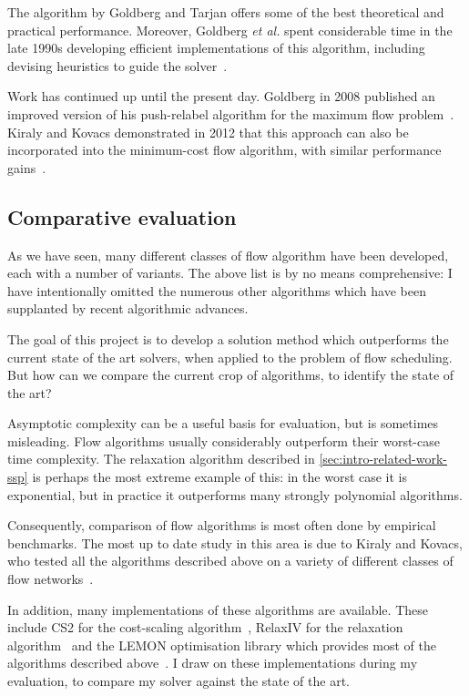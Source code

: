 The algorithm by Goldberg and Tarjan offers some of the best theoretical and practical performance. Moreover, Goldberg \textit{et al.} spent considerable time in the late 1990s developing efficient implementations of this algorithm, including devising heuristics to guide the solver~\cite{Goldberg:1997,Bunnagel:1998}.

Work has continued up until the present day. Goldberg in 2008 published an improved version of his push-relabel algorithm for the maximum flow problem~\cite{Goldberg:2008}. Kiraly and Kovacs demonstrated in 2012 that this approach can also be incorporated into the minimum-cost flow algorithm, with similar performance gains~\cite{KiralyKovacs:2012}.

\subsection{Comparative evaluation}

As we have seen, many different classes of flow algorithm have been developed, each with a number of variants. The above list is by no means comprehensive: I have intentionally omitted the numerous other algorithms which have been supplanted by recent algorithmic advances.

The goal of this project is to develop a solution method which outperforms the current state of the art solvers, when applied to the problem of flow scheduling. But how can we compare the current crop of algorithms, to identify the state of the art? 

Asymptotic complexity can be a useful basis for evaluation, but is sometimes misleading. Flow algorithms usually considerably outperform their worst-case time complexity. The relaxation algorithm described in \cref{sec:intro-related-work-ssp} is perhaps the most extreme example of this: in the worst case it is exponential, but in practice it outperforms many strongly polynomial algorithms.

Consequently, comparison of flow algorithms is most often done by empirical benchmarks. The most up to date study in this area is due to Kiraly and Kovacs, who tested all the algorithms described above on a variety of different classes of flow networks~\cite{KiralyKovacs:2012,Kovacs:2015}.

In addition, many implementations of these algorithms are available. These include CS2 for the cost-scaling algorithm~\cite{CS2:2009}, RelaxIV for the relaxation algorithm~\cite{RelaxIV:2011} and the LEMON optimisation library which provides most of the algorithms described above~\cite{LEMON:2011,LEMON:Software}. I draw on these implementations during my evaluation, to compare my solver against the state of the art.